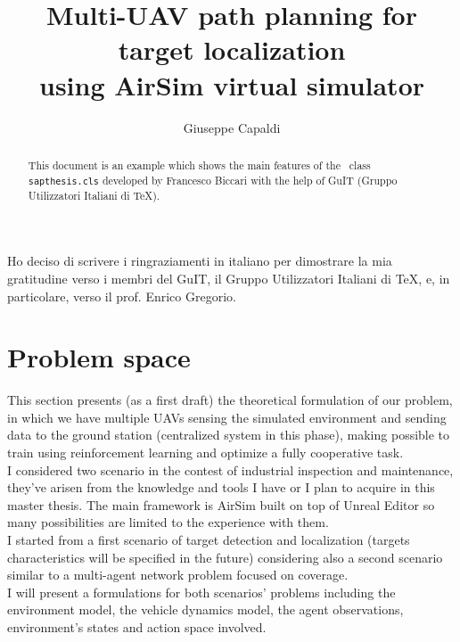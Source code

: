 \documentclass[LaM,binding=0.6cm]{sapthesis}
\title{Multi-UAV path planning for target localization\\ using AirSim virtual simulator}
\author{Giuseppe Capaldi}
\begin{document}
\frontmatter

\maketitle

\dedication{Dedicated to\\ my family}

\begin{abstract}
This document is an example which shows the main features of
the \LaTeXe\ class \texttt{sapthesis.cls} developed by Francesco Biccari
with the help of GuIT (Gruppo Utilizzatori Italiani di \TeX).
\end{abstract}

\begin{acknowledgments}
Ho deciso di scrivere i ringraziamenti in italiano
per dimostrare la mia gratitudine verso i membri
del GuIT, il Gruppo Utilizzatori Italiani di \TeX, e, in particolare,
verso il prof. Enrico Gregorio.
\end{acknowledgments}

\tableofcontents

\chapter{Problem space}
This section presents (as a first draft) the theoretical formulation of our problem, in which we have multiple UAVs sensing the simulated environment and sending data to the ground station (centralized system in this phase), making possible to train using reinforcement learning and optimize a fully cooperative task.  \\
I considered two scenario in the contest of industrial inspection and maintenance, they've arisen from the knowledge and tools I have or I plan to acquire in this master thesis. The main framework is AirSim built on top of Unreal Editor so many possibilities are limited to the experience with them.
\\
I started from a first scenario of target detection and localization (targets characteristics will be specified in the future) considering also a second scenario similar to a multi-agent network problem focused on coverage. \\
I will present a formulations for both scenarios' problems including the environment model, the vehicle dynamics model, the agent observations, environment's states and action space involved. \\
\end{document}
